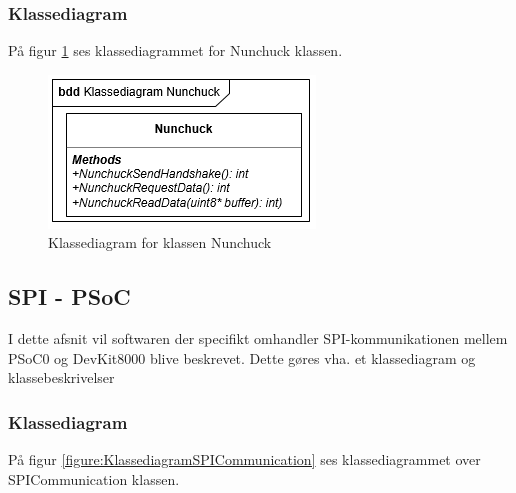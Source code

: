 \subsubsection{Klassediagram}
På figur \ref{figure:NunchuckKlassediagram} ses klassediagrammet for Nunchuck klassen.

\begin{figure}[H]
	\centering
	\includegraphics[]{DesignOgImplementering/images/nunchuck}
	\caption{Klassediagram for klassen Nunchuck}
	\label{figure:NunchuckKlassediagram}
\end{figure}

\subsection{SPI - PSoC}
I dette afsnit vil softwaren der specifikt omhandler SPI-kommunikationen mellem PSoC0 og DevKit8000 blive beskrevet. Dette gøres vha. et klassediagram og klassebeskrivelser

\subsubsection{Klassediagram}
På figur \ref{figure:KlassediagramSPICommunication} ses klassediagrammet over SPICommunication klassen.

